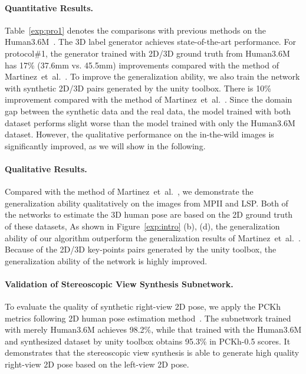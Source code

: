 \documentclass[10pt,twocolumn,letterpaper]{article}
\def\etal{et~al.\xspace}
\begin{document}
\paragraph{Quantitative Results.}
Table~\ref{exp:pro1} denotes the comparisons with previous methods on the Human3.6M~\cite{h36m_pami}.
The 3D label generator achieves state-of-the-art performance.
For protocol\#1, the generator trained with 2D/3D ground truth from Human3.6M has 17\% (37.6mm vs. 45.5mm) improvements compared with the method of Martinez~\etal~\cite{martinez2017simple}.
To improve the generalization ability, we also train the network with synthetic 2D/3D pairs generated by the unity toolbox.
There is 10\% improvement compared with the method of Martinez~\etal~\cite{martinez2017simple}.
Since the domain gap between the synthetic data and the real data, the model trained with both dataset performs slight worse than the model trained with only the Human3.6M dataset.
However, the qualitative performance on the in-the-wild images is significantly improved, as we will show in the following.
\paragraph{Qualitative Results.}\vspace{-3mm}
Compared with the method of Martinez~\etal~\cite{martinez2017simple}, we demonstrate the generalization ability qualitatively on the images from MPII and LSP.
Both of the networks to estimate the 3D human pose are based on the 2D ground truth of these datasets, 
As shown in Figure~\ref{exp:intro} (b), (d), the generalization ability of our algorithm outperform the generalization results of Martinez~\etal~\cite{martinez2017simple}.
Because of the 2D/3D key-points pairs generated by the unity toolbox, the generalization ability of the network is highly improved.
\paragraph{Validation of Stereoscopic View Synthesis Subnetwork.}\vspace{-3mm}
To evaluate the quality of synthetic right-view 2D pose, we apply the PCKh metrics following 2D human pose estimation method~\cite{newell2016stacked}.
The subnetwork trained with merely Human3.6M achieves 98.2\%, while that trained with the Human3.6M and synthesized dataset by unity toolbox obtains 95.3\% in PCKh-0.5 scores.
It demonstrates that the stereoscopic view synthesis is able to generate high quality right-view 2D pose based on the left-view 2D pose.
\end{document}
